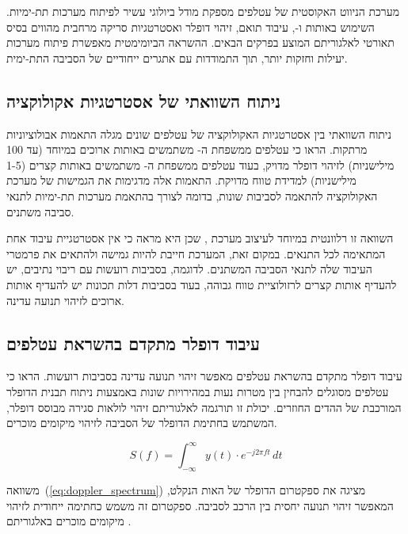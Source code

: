 מערכת הניווט האקוסטית של עטלפים מספקת מודל ביולוגי עשיר לפיתוח מערכות  תת-ימיות. השימוש באותות  ו-, עיבוד תואם, זיהוי דופלר ואסטרטגיות סריקה מרחבית מהווים בסיס תאורטי לאלגוריתם  המוצע בפרקים הבאים. ההשראה הביומימטית מאפשרת פיתוח מערכות יעילות וחזקות יותר, תוך התמודדות עם אתגרים ייחודיים של הסביבה התת-ימית.

\subsection{ניתוח השוואתי של אסטרטגיות אקולוקציה}
\label{sec:comparative_echolocation}

ניתוח השוואתי בין אסטרטגיות האקולוקציה של עטלפים שונים מגלה התאמות אבולוציוניות מרתקות. \citet{GriffithBatEcholocation} הראו כי עטלפים ממשפחת ה- משתמשים באותות  ארוכים במיוחד (עד 100 מילישניות) לזיהוי דופלר מדויק, בעוד עטלפים ממשפחת ה- משתמשים באותות  קצרים (1-5 מילישניות) למדידת טווח מדויקת. התאמות אלה מדגימות את הגמישות של מערכת האקולוקציה להתאמה לסביבות שונות, בדומה לצורך בהתאמת מערכות  תת-ימיות לתנאי סביבה משתנים.

השוואה זו רלוונטית במיוחד לעיצוב מערכת , שכן היא מראה כי אין אסטרטגיית עיבוד אחת המתאימה לכל התנאים. במקום זאת, המערכת חייבת להיות גמישה ולהתאים את פרמטרי העיבוד שלה לתנאי הסביבה המשתנים. לדוגמה, בסביבות רועשות עם ריבוי נתיבים, יש להעדיף אותות  קצרים לרזולוציית טווח גבוהה, בעוד בסביבות דלות תכונות יש להעדיף אותות  ארוכים לזיהוי תנועה עדינה.

\subsection{עיבוד דופלר מתקדם בהשראת עטלפים}
\label{sec:advanced_doppler}

עיבוד דופלר מתקדם בהשראת עטלפים מאפשר זיהוי תנועה עדינה בסביבות רועשות. \citet{Simmons1979BatSonar} הראו כי עטלפים מסוגלים להבחין בין מטרות נעות במהירויות שונות באמצעות ניתוח תבנית הדופלר המורכבת של ההדים החוזרים. יכולת זו תורגמה לאלגוריתם זיהוי לולאות סגירה מבוסס דופלר, המשתמש בחתימת הדופלר של הסביבה לזיהוי מיקומים מוכרים.

\begin{equation}
S(f) = \int_{-\infty}^{\infty} y(t) \cdot e^{-j2\pi ft} \, dt
\label{eq:doppler_spectrum}
\end{equation}

משוואה~(\ref{eq:doppler_spectrum}) מציגה את ספקטרום הדופלר של האות הנקלט, המאפשר זיהוי תנועה יחסית בין הרכב לסביבה. ספקטרום זה משמש כחתימה ייחודית לזיהוי מיקומים מוכרים באלגוריתם .

